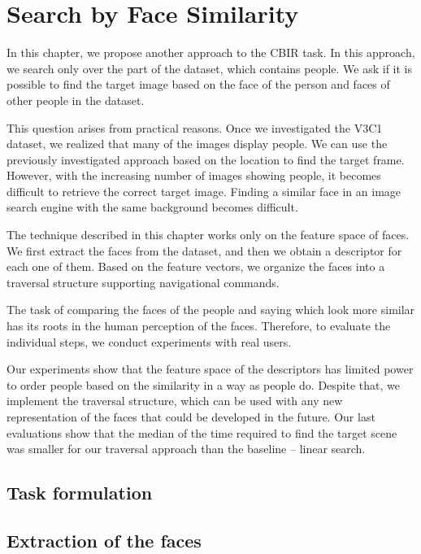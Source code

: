 \chapter{Search by Face Similarity}
\label{ch:face_search}

In this chapter, we propose another approach to the CBIR task. In this approach, we search only over the part of the dataset, which contains people. We ask if it is possible to find the target image based on the face of the person and faces of other people in the dataset.

This question arises from practical reasons. Once we investigated the V3C1 dataset, we realized that many of the images display people. We can use the previously investigated approach based on the location to find the target frame. However, with the increasing number of images showing people, it becomes difficult to retrieve the correct target image. Finding a similar face in an image search engine with the same background becomes difficult.

The technique described in this chapter works only on the feature space of faces. We first extract the faces from the dataset, and then we obtain a descriptor for each one of them. Based on the feature vectors, we organize the faces into a traversal structure supporting navigational commands.

The task of comparing the faces of the people and saying which look more similar has its roots in the human perception of the faces. Therefore, to evaluate the individual steps, we conduct experiments with real users.

Our experiments show that the feature space of the descriptors has limited power to order people based on the similarity in a way as people do. Despite that, we implement the traversal structure, which can be used with any new representation of the faces that could be developed in the future. Our last evaluations show that the median of the time required to find the target scene was smaller for our traversal approach than the baseline -- linear search.

\section{Task formulation}

\todo[inline]{}

\section{Extraction of the faces}

